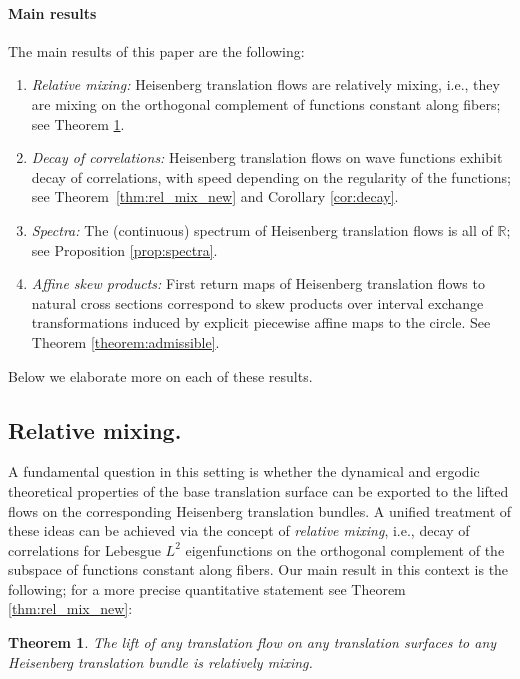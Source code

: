 \documentclass{amsart}
\newtheorem{theorem}{Theorem}[section]
\theoremstyle{definition}
\theoremstyle{remark}
\numberwithin{equation}{section}
\newcommand{\<}{{\langle}}
\renewcommand{\>}{{\rangle}}
\newcommand{\giovanni}[1]{{\color{blue} \sf  G: [#1]}}
\begin{document}
\paragraph*{\bf Main results} The main results of this paper are the following:
\begin{enumerate}
    \item \textit{Relative mixing:} Heisenberg translation flows are relatively mixing, i.e., they are mixing on the orthogonal complement of functions constant along fibers; see Theorem \ref{theo:real_weak_mix}.
    \item \textit{Decay of correlations:} Heisenberg translation flows on wave functions exhibit decay of correlations, with speed depending on the regularity of the functions; see Theorem~\ref{thm:rel_mix_new} and Corollary \ref{cor:decay}. %
    \item \textit{Spectra:} The (continuous) spectrum of Heisenberg translation flows is all of $\mathbb{R}$; see Proposition \ref{prop:spectra}.
    \item \textit{Affine skew products:} First return maps of Heisenberg translation flows to natural cross sections correspond to skew products over interval exchange transformations induced by explicit piecewise affine maps to the circle. See Theorem \ref{theorem:admissible}.\\
\end{enumerate}

Below we elaborate more on each of these results.

\subsection{Relative mixing.}\label{sec:relative} A fundamental question in this setting is whether the dynamical and ergodic theoretical properties of the base translation surface can be exported to the lifted flows on the corresponding Heisenberg translation bundles. A unified treatment of these ideas can be achieved via the concept of \textit{relative mixing}, i.e., decay of correlations for Lebesgue $L^2$ eigenfunctions on the orthogonal complement of the subspace of functions constant along fibers. Our main result in this context is the following; for a more precise quantitative statement see Theorem \ref{thm:rel_mix_new}:

\begin{theorem}
    \label{theo:real_weak_mix}
    The lift of any translation flow on any translation surfaces to any Heisenberg translation bundle is relatively  mixing.
\end{theorem}
\end{document}
